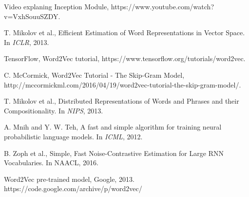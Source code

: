 \begin{thebibliography}{999}
Video explaning Inception Module, https://www.youtube.com/watch?v=VxhSouuSZDY.

T. Mikolov et al., Efficient Estimation of Word Representations in Vector Space. In \textit{ICLR}, 2013.

TensorFlow, Word2Vec tutorial, https://www.tensorflow.org/tutorials/word2vec.

C. McCormick, Word2Vec Tutorial - The Skip-Gram Model, http://mccormickml.com/2016/04/19/word2vec-tutorial-the-skip-gram-model/.

T. Mikolov et al., Distributed Representations of Words and Phrases and their Compositionality. In \textit{NIPS}, 2013.

A. Mnih and Y. W. Teh, A fast and simple algorithm for training neural probabilistic language models. In \textit{ICML}, 2012.

B. Zoph et al., Simple, Fast Noise-Contrastive Estimation for Large RNN Vocabularies. In {NAACL}, 2016.

Word2Vec pre-trained model, Google, 2013. https://code.google.com/archive/p/word2vec/

\end{thebibliography}




